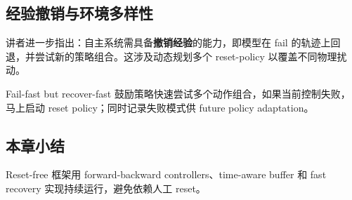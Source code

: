 \subsection{经验撤销与环境多样性}
讲者进一步指出：自主系统需具备\textbf{撤销经验}的能力，即模型在 fail 的轨迹上回退，并尝试新的策略组合。这涉及动态规划多个 reset-policy 以覆盖不同物理扰动。
\begin{warningbox}{Fail-fast but recover-fast}
鼓励策略快速尝试多个动作组合，如果当前控制失败，马上启动 reset policy；同时记录失败模式供 future policy adaptation。
\end{warningbox}

\subsection{本章小结}
Reset-free 框架用 forward-backward controllers、time-aware buffer 和 fast recovery 实现持续运行，避免依赖人工 reset。
\newpage

